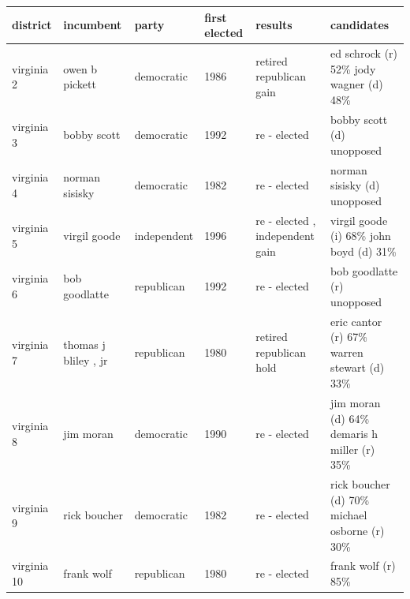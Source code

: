 \documentclass{article}
\begin{document}
\begin{tabular}{llllll}
\toprule
district & incumbent & party & first elected & results & candidates \\
\midrule
virginia 2 & owen b pickett & democratic & 1986 & retired republican gain & ed schrock (r) 52\% jody wagner (d) 48\% \\
virginia 3 & bobby scott & democratic & 1992 & re - elected & bobby scott (d) unopposed \\
virginia 4 & norman sisisky & democratic & 1982 & re - elected & norman sisisky (d) unopposed \\
virginia 5 & virgil goode & independent & 1996 & re - elected , independent gain & virgil goode (i) 68\% john boyd (d) 31\% \\
virginia 6 & bob goodlatte & republican & 1992 & re - elected & bob goodlatte (r) unopposed \\
virginia 7 & thomas j bliley , jr & republican & 1980 & retired republican hold & eric cantor (r) 67\% warren stewart (d) 33\% \\
virginia 8 & jim moran & democratic & 1990 & re - elected & jim moran (d) 64\% demaris h miller (r) 35\% \\
virginia 9 & rick boucher & democratic & 1982 & re - elected & rick boucher (d) 70\% michael osborne (r) 30\% \\
virginia 10 & frank wolf & republican & 1980 & re - elected & frank wolf (r) 85\% \\
\bottomrule
\end{tabular}
\end{document}
